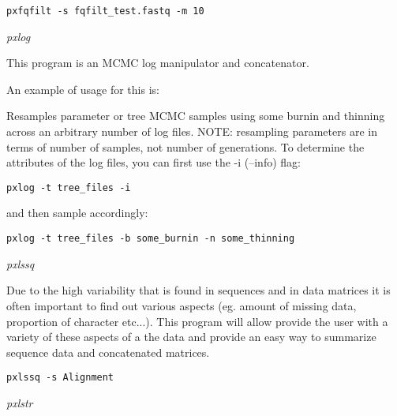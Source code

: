 \documentclass[12pt,letterpaper]{article}
\renewcommand{\subsection}[1]{%
\bigskip
\begin{center}
\begin{large}
\normalfont\itshape #1
\end{large}
\end{center}}
\begin{document}
\begin{flushleft}
\begin{verbatim}
pxfqfilt -s fqfilt_test.fastq -m 10
\end{verbatim}
\end{flushleft}

\subsection{pxlog}

This program is an MCMC log manipulator and concatenator. 

An example of usage for this is:

Resamples parameter or tree MCMC samples using some burnin and thinning across an arbitrary number of log files. NOTE: resampling parameters are in terms of number of samples, not number of generations. To determine the attributes of the log files, you can first use the -i (--info) flag:

\begin{flushleft}
\begin{verbatim}
pxlog -t tree_files -i
\end{verbatim}
\end{flushleft}
and then sample accordingly:
\begin{flushleft}
\begin{verbatim}
pxlog -t tree_files -b some_burnin -n some_thinning
\end{verbatim}
\end{flushleft}

\subsection{pxlssq}

Due to the high variability that is found in sequences and in data matrices it is often important to find out various aspects (eg. amount of missing data, proportion of character etc...). This program will allow provide the user with a variety of these aspects of a the data and provide an easy way to summarize sequence data and concatenated matrices.

\begin{flushleft}
\begin{verbatim}
pxlssq -s Alignment
\end{verbatim}
\end{flushleft}

\subsection{pxlstr}
\end{document}
